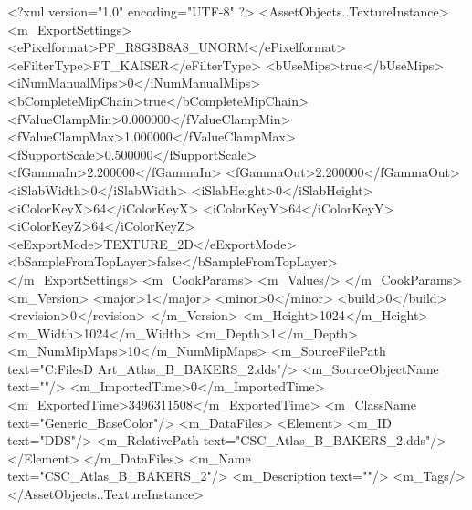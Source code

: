 <?xml version="1.0" encoding="UTF-8" ?>
<AssetObjects..TextureInstance>
	<m_ExportSettings>
		<ePixelformat>PF_R8G8B8A8_UNORM</ePixelformat>
		<eFilterType>FT_KAISER</eFilterType>
		<bUseMips>true</bUseMips>
		<iNumManualMips>0</iNumManualMips>
		<bCompleteMipChain>true</bCompleteMipChain>
		<fValueClampMin>0.000000</fValueClampMin>
		<fValueClampMax>1.000000</fValueClampMax>
		<fSupportScale>0.500000</fSupportScale>
		<fGammaIn>2.200000</fGammaIn>
		<fGammaOut>2.200000</fGammaOut>
		<iSlabWidth>0</iSlabWidth>
		<iSlabHeight>0</iSlabHeight>
		<iColorKeyX>64</iColorKeyX>
		<iColorKeyY>64</iColorKeyY>
		<iColorKeyZ>64</iColorKeyZ>
		<eExportMode>TEXTURE_2D</eExportMode>
		<bSampleFromTopLayer>false</bSampleFromTopLayer>
	</m_ExportSettings>
	<m_CookParams>
		<m_Values/>
	</m_CookParams>
	<m_Version>
		<major>1</major>
		<minor>0</minor>
		<build>0</build>
		<revision>0</revision>
	</m_Version>
	<m_Height>1024</m_Height>
	<m_Width>1024</m_Width>
	<m_Depth>1</m_Depth>
	<m_NumMipMaps>10</m_NumMipMaps>
	<m_SourceFilePath text="C:\Users\Shadow\Desktop\Working Files\3D Art\Textures\CSC_Atlas_B_BAKERS_2.dds"/>
	<m_SourceObjectName text=""/>
	<m_ImportedTime>0</m_ImportedTime>
	<m_ExportedTime>3496311508</m_ExportedTime>
	<m_ClassName text="Generic_BaseColor"/>
	<m_DataFiles>
		<Element>
			<m_ID text="DDS"/>
			<m_RelativePath text="CSC_Atlas_B_BAKERS_2.dds"/>
		</Element>
	</m_DataFiles>
	<m_Name text="CSC_Atlas_B_BAKERS_2"/>
	<m_Description text=""/>
	<m_Tags/>
</AssetObjects..TextureInstance>

